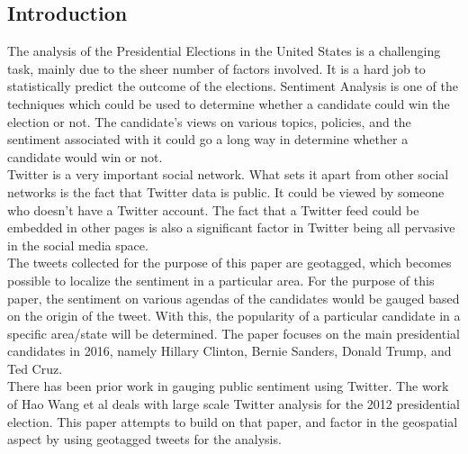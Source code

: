 \documentclass[twoside]{article}
\begin{document}
\begin{multicols}{2} %

\section{Introduction}

The analysis of the Presidential Elections in the United States is a challenging task, mainly due to the sheer number of factors involved. It is a hard job to statistically predict the outcome of the elections. Sentiment Analysis is one of the techniques which could be used to determine whether a candidate could win the election or not. The candidate's views on various topics, policies, and the sentiment associated with it could go a long way in determine whether a candidate would win or not.  \\

Twitter is a very important social network. What sets it apart from other social networks is the fact that Twitter data is public. It could be viewed by someone who doesn't have a Twitter account. The fact that a Twitter feed could be embedded in other pages is also a significant factor in Twitter being all pervasive in the social media space. \\

The tweets collected for the purpose of this paper are geotagged, which becomes possible to localize the sentiment in a particular area. For the purpose of this paper, the sentiment on various agendas of the candidates would be gauged based on the origin of the tweet. With this, the popularity of a particular candidate in a specific area/state will be determined. The paper focuses on the main presidential candidates in 2016, namely Hillary Clinton, Bernie Sanders, Donald Trump, and Ted Cruz. \\

There has been prior work in gauging public sentiment using Twitter. The work of Hao Wang et al\cite{Wang:2012:SRT:2390470.2390490} deals with large scale Twitter analysis for the 2012 presidential election. This paper attempts to build on that paper, and factor in the geospatial aspect by using geotagged tweets for the analysis.


\end{multicols}
\end{document}
